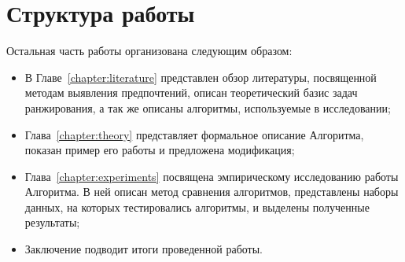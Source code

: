 
\section*{Структура работы}
Остальная часть работы организована следующим образом:
\begin{itemize}
	\item В Главе~\ref{chapter:literature} представлен обзор литературы, посвященной методам выявления предпочтений, описан теоретический базис задач ранжирования, а так же описаны алгоритмы, используемые в исследовании;
	\item Глава~\ref{chapter:theory} представляет формальное описание Алгоритма, показан пример его работы и предложена модификация;
	\item Глава~\ref{chapter:experiments} посвящена эмпирическому исследованию работы Алгоритма. В ней описан метод сравнения алгоритмов, представлены наборы данных, на которых тестировались алгоритмы, и выделены полученные результаты;
	\item Заключение подводит итоги проведенной работы.
\end{itemize}
